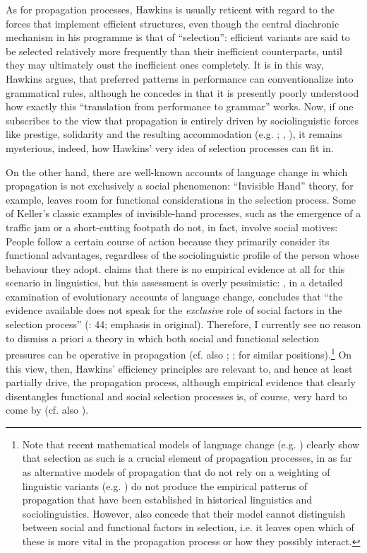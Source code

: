 \documentclass[output=paper]{langsci/langscibook}
\begin{document}
As for propagation processes, Hawkins is usually reticent with regard to the forces that implement efficient structures, even though the central diachronic mechanism in his programme is that of “selection”: efficient variants are said to be selected relatively more frequently than their inefficient counterparts, until they may ultimately oust the inefficient ones completely. It is in this way, Hawkins argues, that preferred patterns in performance can conventionalize into grammatical rules, although he concedes in \citet[10]{Hawkins2014} that it is presently poorly understood how exactly this “translation from performance to grammar” works. Now, if one subscribes to the view that propagation is entirely driven by sociolinguistic forces like prestige, solidarity and the resulting accommodation (e.g. \citealt{Croft2000}; \citealt{Cristofaro2017}, \citealt{Cristofaro2019 [this volume]}), it remains mysterious, indeed, how Hawkins’ very idea of selection processes can fit in. 

On the other hand, there are well-known accounts of language change in which propagation is not exclusively a social phenomenon:  “Invisible Hand” theory, for example, leaves room for functional considerations in the selection process. Some of Keller’s classic examples of invisible-hand processes, such as the emergence of a traffic jam or a short-cutting footpath do not, in fact, involve social motives: People follow a certain course of action because they primarily consider its functional advantages, regardless of the sociolinguistic profile of the person whose behaviour they adopt. \citet{Cristofaro2017} claims that there is no empirical evidence at all for this scenario in linguistics, but this assessment is overly pessimistic: \citet{Rosenbach2008}, in a detailed examination of evolutionary accounts of language change, concludes that “the evidence available does not speak for the \textit{exclusive} role of social factors in the selection process” (\citealt{Rosenbach2008}: 44; emphasis in original). Therefore, I currently see no reason to dismiss a priori a theory in which both social and functional selection pressures can be operative in propagation (cf. also \citealt{Haspelmath1999}; \citealt{Nettle1999}; \citealt{Enfield2014} for similar positions).\footnote{Note that recent mathematical models of language change (e.g. \citealt{BlytheCroft2012}) clearly show that selection as such is a crucial element of propagation processes, in as far as alternative models of propagation that do not rely on a weighting of linguistic variants (e.g. \citealt{Trudgill2004}) do not produce the empirical patterns of propagation that have been established in historical linguistics and sociolinguistics. However, \citet{BlytheCroft2012} also concede that their model cannot distinguish between social and functional factors in selection, i.e. it leaves open which of these is more vital in the propagation process or how they possibly interact.} On this view, then, Hawkins’ efficiency principles are relevant to, and hence at least partially drive, the propagation process, although empirical evidence that clearly disentangles functional and social selection processes is, of course, very hard to come by (cf. also \citealt{Seiler2006}). 
\end{document}
